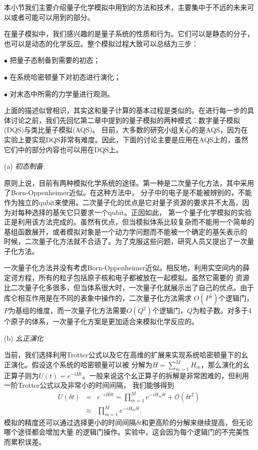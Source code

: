 本小节我们主要介绍量子化学模拟中用到的方法和技术，主要集中于不远的未来可以或者可能可以用到的部分。

在量子模拟中，我们感兴趣的是量子系统的性质和行为。它们可以是静态的分子，也可以是动态的化学反应。整个模拟过程大致可以总结为三步：

$\bullet$ 把量子态制备到需要的初态；

$\bullet$ 在系统哈密顿量下对初态进行演化；

$\bullet$ 对末态中所需的力学量进行观测。

上面的描述似曾相识，其实这和量子计算的基本过程是类似的。在进行每一步的具体讨论之前，我们先回忆第二章中提到的量子模拟的两种模式：数字量子模拟(DQS)与类比量子模拟(AQS)。
目前，大多数的研究小组关心的是AQS，因为在实验上要实现DQS非常有难度。因此，下面的讨论主要是应用在AQS上的，虽然它们中的部分内容也可以用在DQS上。

(a) \emph{ 初态制备}

原则上说，目前有两种模拟化学系统的途径\cite{chem1}。第一种是二次量子化方法，其中采用了Born-Oppenheimer近似。在这种方法中，
分子中的电子是不能被辨别的，不能作为独立的qubit来使用。二次量子化的优点是它对量子资源的要求并不太高，因为对每种选择的基矢它只要求一个qubit。正因如此，
第一个量子化学模拟的实验正是利用该方法完成的\cite{optics_static}。虽然有优点，但当模拟体系比较复杂而不能用一个简单的基组函数展开，或者模拟对象是一个动力学问题而不能被一个确定的基矢表示的
时候，二次量子化方法就不合适了。为了克服这些问题，研究人员又提出了一次量子化方法。

一次量子化方法并没有考虑Born-Oppenheimer近似。相反地，利用实空间内的薛定谔方程，所有的粒子包括原子核和电子都被放在一起模拟\cite{trotter,qschem19,Polynomial_time_algorithm}。虽然它需要的
资源比二次量子化多很多，但当体系很大时，一次量子化就展示出了自己的优点。由于库仑相互作用是在不同的表象中操作的，二次量子化方法需求
$O(P^5)$个逻辑门，$P$为基组的维度，而一次量子化方法需要$O(Q^2)$个逻辑门，$Q$为粒子数。对多于4个原子的体系，一次量子化方案是更加适合来模拟化学反应的\cite{Polynomial_time_algorithm}。

(b) \emph{ 幺正演化}

当前，我们选择利用Trotter公式\cite{trotter}以及它在高维的扩展\cite{qschem20,qschem21}来实现系统哈密顿量下的幺正演化。假设这个系统的哈密顿量可以被
分解为$H = \sum_{m=1}^MH_m$，那么演化的幺正算子则为$U(t) = e^{-iHt}$。一般来说这个幺正算子的拆解是非常困难的，但利用一阶Trotter公式以及非常小的时间间隔，
我们能够得到
\begin{eqnarray}
 U(\delta t) & = & e^{-iH\delta t} = \prod\limits_{m=1}^M e^{-iH_m\delta t}+\mathcal {O}(\delta t^2)\nonumber \\
 & \approx & \prod\limits_{m=1}^M e^{-iH_m\delta t}.
\end{eqnarray}
模拟的精度还可以通过选择更小的时间间隔$\delta t$和更高阶的分解来继续提高，但无论哪个途径都会增加大量
的逻辑门操作。实验中，这会因为每个逻辑门的不完美性而累积误差。

